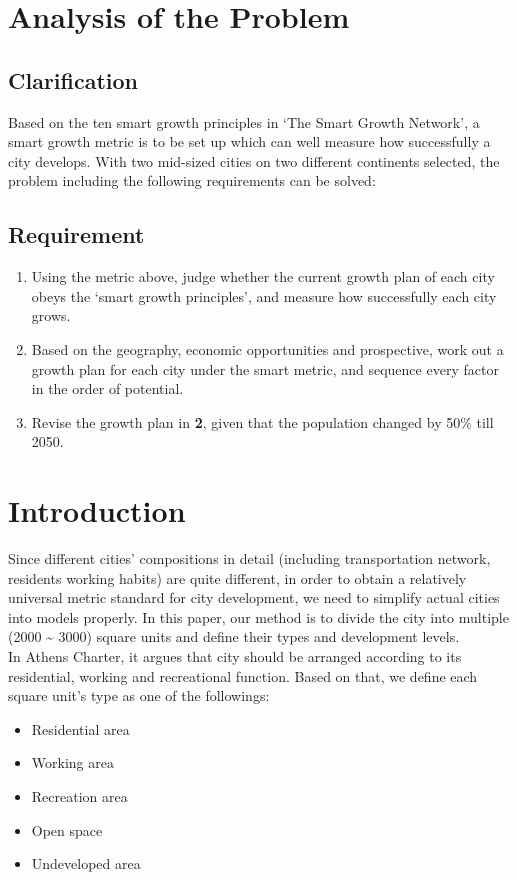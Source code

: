\section{Analysis of the Problem}
\subsection{Clarification}
Based on the ten smart growth principles in `The Smart Growth Network'\cite{pdf:smart-growth}, a  smart growth metric is to be set up which can well measure how successfully a city develops.
With two mid-sized cities on two different continents selected, the problem including the following requirements can be solved:

\subsection{Requirement}
\begin{enumerate}
  \item Using the metric above, judge whether the current growth plan of each city obeys the `smart growth principles', and measure how successfully each city grows.
  \item Based on the geography, economic opportunities and prospective, work out a growth plan for each city under the smart metric, and sequence every factor in the order of potential.
  \item Revise the growth plan in \textbf{2}, given that the population changed by 50\% till 2050.
\end{enumerate}


\section{Introduction}
Since different cities' compositions in detail (including transportation network, residents working habits) are quite different, in order to obtain a relatively universal metric standard for city development, we need to simplify actual cities into models properly.
In this paper, our method is to divide the city into multiple (2000 \~{} 3000) square units and define their types and development levels.\\

In Athens Charter, it argues that city should be arranged according to its residential, working and recreational function.
Based on that, we define each square unit's type as one of the followings:
\begin{itemize}
  \item Residential area
  \item Working area
  \item Recreation area
  \item Open space
  \item Undeveloped area
\end{itemize}

